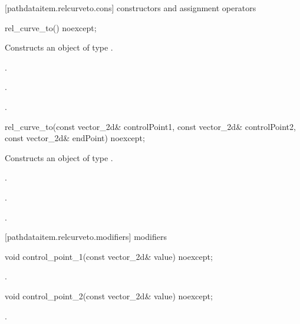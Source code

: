  [pathdataitem.relcurveto.cons] { constructors and assignment operators}

\begin{itemdecl}
    rel_curve_to() noexcept;
\end{itemdecl}
\begin{itemdescr}
	\pnum
	\effects
	Constructs an object of type .
	
	\pnum
	\postconditions
	.

	.

	.
\end{itemdescr}

\begin{itemdecl}
    rel_curve_to(const vector_2d& controlPoint1, const vector_2d& controlPoint2,
      const vector_2d& endPoint) noexcept;
\end{itemdecl}
\begin{itemdescr}
	\pnum
	\effects
	Constructs an object of type .
	
	\pnum
	\postconditions
	.

	.

	.
\end{itemdescr}

 [pathdataitem.relcurveto.modifiers]{ modifiers}

\begin{itemdecl}
    void control_point_1(const vector_2d& value) noexcept;
\end{itemdecl}
\begin{itemdescr}
	\pnum
	\postconditions
	.
\end{itemdescr}

\begin{itemdecl}
    void control_point_2(const vector_2d& value) noexcept;
\end{itemdecl}
\begin{itemdescr}
	\pnum
	\postconditions
	.
\end{itemdescr}

